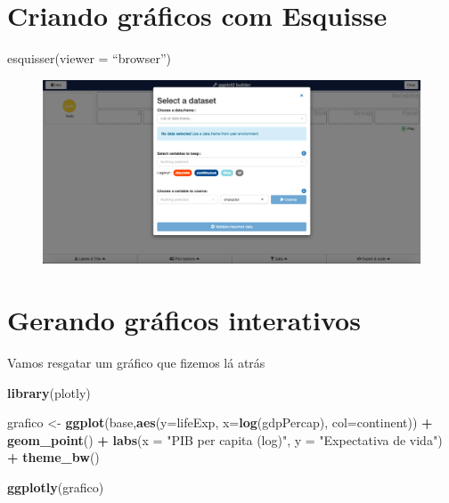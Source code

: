 \documentclass[
]{article}
\newenvironment{Shaded}{\begin{snugshade}}{\end{snugshade}}
\newcommand{\DataTypeTok}[1]{\textcolor[rgb]{0.13,0.29,0.53}{#1}}
\newcommand{\KeywordTok}[1]{\textcolor[rgb]{0.13,0.29,0.53}{\textbf{#1}}}
\newcommand{\NormalTok}[1]{#1}
\newcommand{\OperatorTok}[1]{\textcolor[rgb]{0.81,0.36,0.00}{\textbf{#1}}}
\newcommand{\StringTok}[1]{\textcolor[rgb]{0.31,0.60,0.02}{#1}}
\begin{document}
\hypertarget{criando-gruxe1ficos-com-esquisse}{%
\section{Criando gráficos com
Esquisse}\label{criando-gruxe1ficos-com-esquisse}}

esquisser(viewer = ``browser'')

\begin{figure}

{\centering \includegraphics[width=0.9\linewidth,height=0.7\textheight]{imagem/esquisse} 

}

\caption{ }\label{fig:imagem_esquisse, figures-side}
\end{figure}

\hypertarget{gerando-gruxe1ficos-interativos}{%
\section{Gerando gráficos
interativos}\label{gerando-gruxe1ficos-interativos}}

Vamos resgatar um gráfico que fizemos lá atrás

\begin{Shaded}
\begin{Highlighting}[]
\KeywordTok{library}\NormalTok{(plotly)}

\NormalTok{grafico <-}\StringTok{ }\KeywordTok{ggplot}\NormalTok{(base,}\KeywordTok{aes}\NormalTok{(}\DataTypeTok{y=}\NormalTok{lifeExp, }\DataTypeTok{x=}\KeywordTok{log}\NormalTok{(gdpPercap), }\DataTypeTok{col=}\NormalTok{continent)) }\OperatorTok{+}\StringTok{ }\KeywordTok{geom_point}\NormalTok{() }\OperatorTok{+}
\StringTok{  }\KeywordTok{labs}\NormalTok{(}\DataTypeTok{x =} \StringTok{"PIB per capita (log)"}\NormalTok{,}
       \DataTypeTok{y =} \StringTok{"Expectativa de vida"}\NormalTok{) }\OperatorTok{+}\StringTok{ }\KeywordTok{theme_bw}\NormalTok{()}

\KeywordTok{ggplotly}\NormalTok{(grafico)}
\end{Highlighting}
\end{Shaded}
\end{document}
